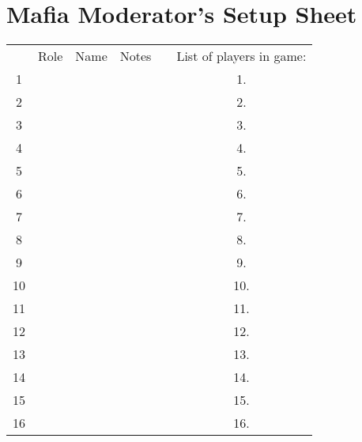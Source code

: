 \documentclass[12pt]{article}
\begin{document}

\section*{Mafia Moderator's Setup Sheet}

\noindent\large
\begin{tabular}{ c | p{1.25in} | p{1.25in} | p{1.25in} | c c c p{1.9in} }
    \cline{2-4}
    & Role & Name & Notes & & \multicolumn{3}{l}{List of players in game:} \\
    \cline{2-4}
    1 & & & & & & 1. & \\
    \cline{2-4} \cline{8-8}
    2 & & & & & & 2. & \\
    \cline{2-4} \cline{8-8}
    3 & & & & & & 3. & \\
    \cline{2-4} \cline{8-8}
    4 & & & & & & 4. & \\
    \cline{2-4} \cline{8-8}
    5 & & & & & & 5. & \\
    \cline{2-4} \cline{8-8}
    6 & & & & & & 6. & \\
    \cline{2-4} \cline{8-8}
    7 & & & & & & 7. & \\
    \cline{2-4} \cline{8-8}
    8 & & & & & & 8. & \\
    \cline{2-4} \cline{8-8}
    9 & & & & & & 9. & \\
    \cline{2-4} \cline{8-8}
    10 & & & & & & 10. & \\
    \cline{2-4} \cline{8-8}
    11 & & & & & & 11. & \\
    \cline{2-4} \cline{8-8}
    12 & & & & & & 12. & \\
    \cline{2-4} \cline{8-8}
    13 & & & & & & 13. & \\
    \cline{2-4} \cline{8-8}
    14 & & & & & & 14. & \\
    \cline{2-4} \cline{8-8}
    15 & & & & & & 15. & \\
    \cline{2-4} \cline{8-8}
    16 & & & & & & 16. & \\
    \cline{2-4} \cline{8-8}
\end{tabular}

\vspace{0.25in}
\end{document}
